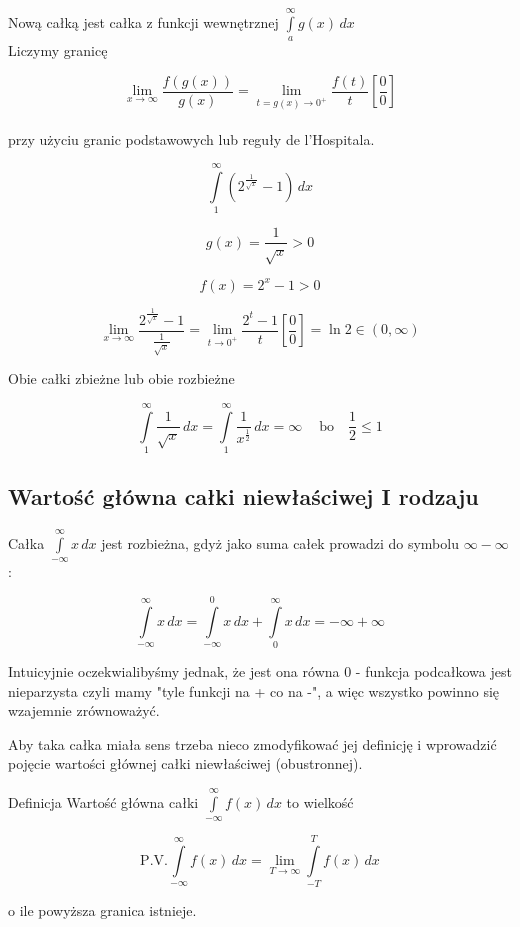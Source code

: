 Nową całką jest całka z funkcji wewnętrznej $ \int\limits_{a}^{\infty} g(x) \,dx $ \\

Liczymy granicę

$$ \lim_{x \to \infty} \frac{f(g(x))}{g(x)} = \lim_{t = g(x) \to 0^+} \frac{f(t)}{t} \left[ \frac{0}{0} \right] $$ \\

przy użyciu granic podstawowych lub reguły de l'Hospitala. \\

\begin{przyklad}

$$ \int\limits_{1}^{\infty} \left( 2^{\frac{1}{\sqrt{x}}} - 1 \right) \,dx $$

$$ g(x) = \frac{1}{\sqrt{x}} > 0 $$

$$ f(x) = 2^x - 1 > 0 $$

$$ \lim_{x \to \infty} \frac{2^{\frac{1}{\sqrt{x}}} - 1}{\frac{1}{\sqrt{x}}} = \lim_{t \to 0^+} \frac{2^t - 1}{t}
\left[ \frac{0}{0} \right] = \ln 2 \in (0, \infty) $$

Obie całki zbieżne lub obie rozbieżne

$$ \int\limits_1^\infty \frac{1}{\sqrt{x}} \,dx = \int\limits_1^\infty \frac{1}{x^{\frac{1}{2}}} \,dx = \infty\ \quad
\textrm{bo} \quad \frac{1}{2} \leq 1 $$
\end{przyklad}

\subsection{Wartość główna całki niewłaściwej I rodzaju}

Całka $ \int\limits_{-\infty}^{\infty} x \,dx $ jest rozbieżna, gdyż jako suma całek prowadzi do symbolu $ \infty - \infty $:

$$ \int\limits_{-\infty}^{\infty} x \,dx = \int\limits_{-\infty}^{0} x \,dx + \int\limits_{0}^{\infty} x \,dx = -\infty + \infty $$

Intuicyjnie oczekwialibyśmy jednak, że jest ona równa 0 - funkcja podcałkowa jest nieparzysta czyli mamy "tyle funkcji
na + co na -", a więc wszystko powinno się wzajemnie zrównoważyć.

Aby taka całka miała sens trzeba nieco zmodyfikować jej definicję i wprowadzić pojęcie wartości głównej całki niewłaściwej (obustronnej).

\begin{tw}{Definicja}
Wartość główna całki $ \int\limits_{-\infty}^{\infty} f(x) \,dx $ to wielkość

$$ \textrm{P.V.} \int\limits_{-\infty}^{\infty} f(x) \,dx = \lim_{T \to \infty} \int\limits_{-T}^{T} f(x) \,dx $$

o ile powyższa granica istnieje.
\end{tw}

